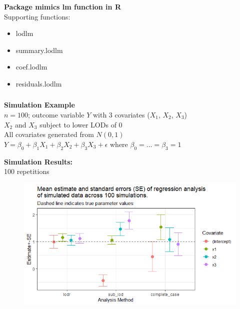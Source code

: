 \documentclass[xcolor=dvipsnames]{beamer}
\begin{document}
\begin{frame}
\frametitle{\insertsectionhead}
\textbf{Package mimics lm function in R}\\
Supporting functions:
\begin{itemize}
\item lod\textunderscore lm
\item summary.lod\textunderscore lm
\item coef.lod\textunderscore lm
\item residuals.lod\textunderscore lm
\end{itemize}
\end{frame}

\begin{frame}
\frametitle{\insertsectionhead}
\textbf{Simulation Example}\\
$n=100$; outcome variable $Y$ with 3 covariates ($X_1$, $X_2$, $X_3$)\\
$X_2$ and $X_3$ subject to lower LODs of 0\\
All covariates generated from $N(0,1)$\\
\vspace{0.5cm}
$Y=\beta_0+\beta_1X_1+\beta_2X_2+\beta_3X_3+\epsilon$ where $\beta_0=\ldots=\beta_3=1$
\end{frame}

\begin{frame}
\textbf{Simulation Results:}\\
100 repetitions\\
\begin{figure}
	\begin{center}
		\includegraphics[scale = 0.75]{sim_results.png}
	\end{center}
\end{figure}
\end{frame}
\end{document}
